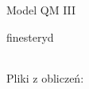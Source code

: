 \begin{section}{Model QM III}
\begin{subsection}{finesteryd}
\begin{tabular}{||c c c c c c||}
\end{tabular}

  
  Pliki z obliczeń:
 \end{subsection}
  

 
\end{section}
